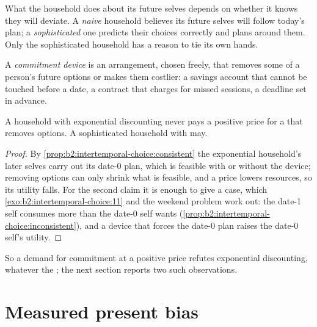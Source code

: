 What the household does about its future selves depends on whether it knows they will deviate. A
\emph{naive} household believes its future selves will follow today's plan; a \emph{sophisticated}
one predicts their choices correctly and plans around them. Only the sophisticated household has a
reason to tie its own hands.

\begin{definition}\label{def:b2:intertemporal-choice:commitment-device}
A \emph{commitment device} is an arrangement, chosen freely, that removes some
of a person's future options or makes them costlier: a savings account that cannot be touched before a
date, a contract that charges for missed sessions, a deadline set in advance.
\end{definition}

\begin{proposition}\label{prop:b2:intertemporal-choice:commitment}
A household with exponential discounting never pays a positive price for a  that
removes options. A sophisticated household with  may.
\end{proposition}

\begin{proof}
By \cref{prop:b2:intertemporal-choice:consistent} the exponential household's later selves carry out
its date-0 plan, which is feasible with or without the device; removing options can only shrink what
is feasible, and a price lowers resources, so its utility falls. For the second claim it is enough to
give a case, which \cref{exo:b2:intertemporal-choice:11} and the weekend problem work out: the
date-1 self consumes more than the date-0 self wants (\cref{prop:b2:intertemporal-choice:inconsistent}),
and a device that forces the date-0 plan raises the date-0 self's utility.
\end{proof}

So a demand for commitment at a positive price refutes exponential discounting, whatever the ; the next section reports two such observations.

\section{Measured present bias}\label{sec:b2:intertemporal-choice:measured}

